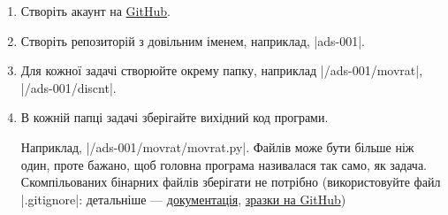 \documentclass[12pt,a4paper]{article}
\begin{document}
\begin{enumerate}
    \item Створіть акаунт на \href{https://github.com}{GitHub}.
    \item Створіть репозиторій з довільним іменем, наприклад, |ads-001|.
    \item Для кожної задачі створюйте окрему папку, наприклад |/ads-001/movrat|, |/ads-001/discnt|.
    \item В кожній папці задачі зберігайте вихідний код програми.

    Наприклад, |/ads-001/movrat/movrat.py|. Файлів може бути більше ніж один, проте бажано, щоб головна програма називалася так само, як задача. Скомпільованих бінарних файлів зберігати не потрібно (використовуйте файл |.gitignore|: детальніше --- \href{http://git-scm.com/docs/gitignore}{документація}, \href{https://github.com/github/gitignore}{зразки на GitHub})
\end{enumerate}
\end{document}
